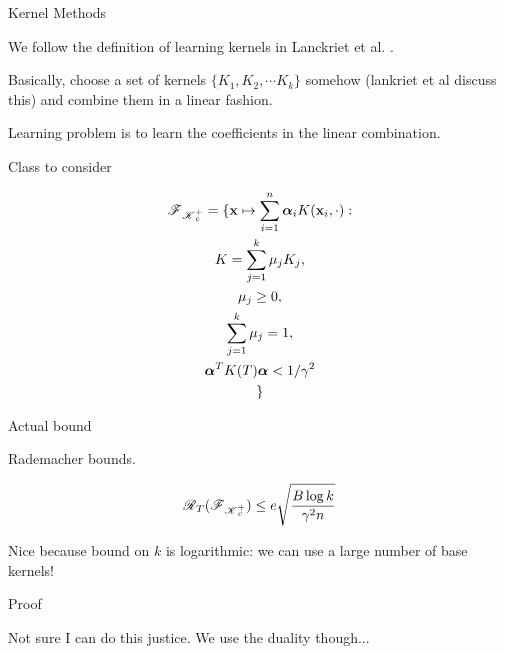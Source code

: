 \begin{frame}{Kernel Methods}

  We follow the definition of learning kernels in Lanckriet et al. \cite{lanckriet2004learning}.

  Basically, choose a set of kernels $\{K_1, K_2, \cdots K_k\}$ somehow (lankriet et al discuss this) and combine them in a linear fashion.

  Learning problem is to learn the coefficients in the linear combination. 

\end{frame}


\begin{frame}{Class to consider}

  \begin{multline}
    \operatorname{\mathscr{F}}_{\operatorname{\mathscr{K}}^+_c} = \{ \mathbf{x} \mapsto \sum_{i=1}^n \boldsymbol\alpha_i K(\mathbf{x}_i, \cdot) : \\
    K = \sum_{j=1}^k \mu_j K_j, \\
    \mu_j \geq 0,\\
    \sum_{j=1}^k \mu_j = 1, \\
    \boldsymbol\alpha^T K(T) \boldsymbol\alpha < 1 / \gamma^2 \\
    \} 
  \end{multline}
  
\end{frame}

\begin{frame}{Actual bound}

  Rademacher bounds.

  \[ \operatorname{\mathscr{R}}_T(\operatorname{\mathscr{F}}_{\operatorname{\mathscr{K}}^+_c}) \leq e \sqrt{\frac{B \log k}{\gamma^2 n}} \]

  Nice because bound on $k$ is logarithmic: we can use a large number of base kernels!
  
\end{frame}

\begin{frame}{Proof}

  Not sure I can do this justice. We use the duality though...
  
\end{frame}
